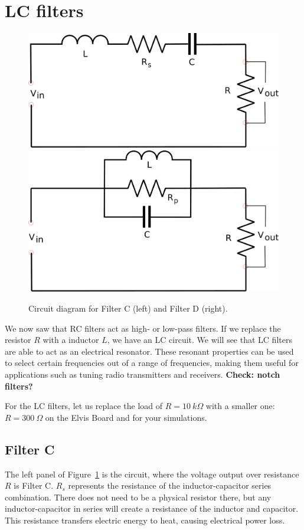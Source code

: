 \documentclass{article}
\begin{document}
\section*{LC filters}
\begin{figure}
  \centering
  \includegraphics[width=0.45\columnwidth]{images/LCseries} \hfill
  \includegraphics[width=0.45\columnwidth]{images/LCparallel}
  \caption{Circuit diagram for Filter C (left) and Filter D
    (right).}
  \label{fig:filterCD}
\end{figure}
We now saw that RC filters act as high- or low-pass filters. If we
replace the resistor $R$ with a inductor $L$, we have an LC circuit.
We will see that LC filters are able to act as an electrical
resonator. These resonant properties can be used to select certain
frequencies out of a range of frequencies, making them useful for
applications such as tuning radio transmitters and receivers. {\bf
  Check: notch filters?}

For the LC filters, let us replace the load of $R=10~k\Omega$ with a
smaller one: $R= 300~\Omega$ on the Elvis Board and for your
simulations.

\subsection*{Filter C}
The left panel of Figure~\ref{fig:filterCD} is the circuit, where the
voltage output over resistance $R$ is Filter C.  $R_s$ represents the
resistance of the inductor-capacitor series combination. There does
not need to be a physical resistor there, but any inductor-capacitor
in series will create a resistance of the inductor and capacitor. This
resistance transfers electric energy to heat, causing electrical power
loss.
\end{document}
